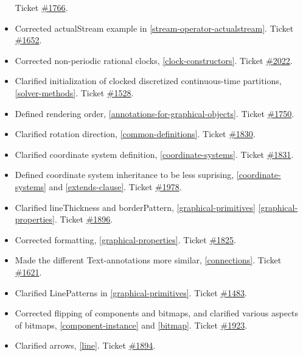 \begin{itemize}
  Ticket \href{https://trac.modelica.org/Modelica/ticket/1766}{\#1766}.
\item
  Corrected actualStream example in \ref{stream-operator-actualstream}. Ticket
  \href{https://trac.modelica.org/Modelica/ticket/1652}{\#1652}.
\item
  Corrected non-periodic rational clocks, \ref{clock-constructors}. Ticket
  \href{https://trac.modelica.org/Modelica/ticket/2022}{\#2022}.
\item
  Clarified initialization of clocked discretized continuous-time
  partitions, \ref{solver-methods}. Ticket
  \href{https://trac.modelica.org/Modelica/ticket/1528}{\#1528}.
\item
  Defined rendering order, \ref{annotations-for-graphical-objects}. Ticket
  \href{https://trac.modelica.org/Modelica/ticket/1750}{\#1750}.
\item
  Clarified rotation direction, \ref{common-definitions}. Ticket
  \href{https://trac.modelica.org/Modelica/ticket/1830}{\#1830}.
\item
  Clarified coordinate system definition, \ref{coordinate-systems}. Ticket
  \href{https://trac.modelica.org/Modelica/ticket/1831}{\#1831}.
\item
  Defined coordinate system inheritance to be less suprising, 
  \ref{coordinate-systems} and \ref{extends-clause}. Ticket
  \href{https://trac.modelica.org/Modelica/ticket/1978}{\#1978}.
\item
  Clarified lineThickness and borderPattern, \ref{graphical-primitives} \ref{graphical-properties}.
  Ticket \href{https://trac.modelica.org/Modelica/ticket/1896}{\#1896}.
\item
  Corrected formatting, \ref{graphical-properties}. Ticket
  \href{https://trac.modelica.org/Modelica/ticket/1825}{\#1825}.
\item
  Made the different Text-annotations more similar, \ref{connections}.
  Ticket \href{https://trac.modelica.org/Modelica/ticket/1621}{\#1621}.
\item
  Clarified LinePatterns in \ref{graphical-primitives}. Ticket
  \href{https://trac.modelica.org/Modelica/ticket/1483}{\#1483}.
\item
  Corrected flipping of components and bitmaps, and clarified various
  aspects of bitmaps, \ref{component-instance} and \ref{bitmap}. Ticket
  \href{https://trac.modelica.org/Modelica/ticket/1923}{\#1923}.
\item
  Clarified arrows, \ref{line}. Ticket
  \href{https://trac.modelica.org/Modelica/ticket/1894}{\#1894}.

\end{itemize}
